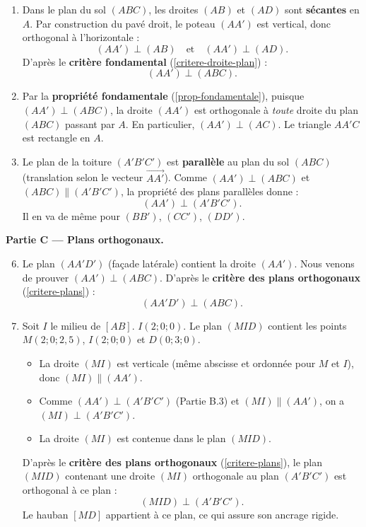 \documentclass[11pt]{article}
\begin{document}
\begin{exoresolu}
\begin{enumerate}[label=\arabic*., ref=\arabic*]
    \item Dans le plan du sol $(ABC)$, les droites $(AB)$ et $(AD)$ sont \textbf{sécantes} en $A$.
    Par construction du pavé droit, le poteau $(AA')$ est vertical, donc orthogonal à l'horizontale :
    \[ (AA') \perp (AB) \quad \text{et} \quad (AA') \perp (AD). \]
    D'après le \textbf{critère fondamental} (\ref{critere-droite-plan}) :
    \[ \boxed{(AA') \perp (ABC)}. \]
    \item Par la \textbf{propriété fondamentale} (\ref{prop-fondamentale}), puisque $(AA') \perp (ABC)$, la droite $(AA')$ est orthogonale à \emph{toute} droite du plan $(ABC)$ passant par $A$.
    En particulier, $(AA') \perp (AC)$. Le triangle $AA'C$ est rectangle en $A$.
    \item Le plan de la toiture $(A'B'C')$ est \textbf{parallèle} au plan du sol $(ABC)$ (translation selon le vecteur $\vec{AA'}$).
    Comme $(AA') \perp (ABC)$ et $(ABC) \parallel (A'B'C')$, la propriété des plans parallèles donne :
    \[ \boxed{(AA') \perp (A'B'C')}. \]
    Il en va de même pour $(BB')$, $(CC')$, $(DD')$.
\end{enumerate}

\textbf{Partie C — Plans orthogonaux.}

\begin{enumerate}[label=\arabic*., ref=\arabic*]
    \setcounter{enumi}{5}
    \item Le plan $(AA'D')$ (façade latérale) contient la droite $(AA')$.
    Nous venons de prouver $(AA') \perp (ABC)$.
    D'après le \textbf{critère des plans orthogonaux} (\ref{critere-plans}) :
    \[ \boxed{(AA'D') \perp (ABC)}. \]
    \item Soit $I$ le milieu de $[AB]$. $I(2;0;0)$. Le plan $(MID)$ contient les points $M(2;0;2,5)$, $I(2;0;0)$ et $D(0;3;0)$.
    \begin{itemize}
        \item La droite $(MI)$ est verticale (même abscisse et ordonnée pour $M$ et $I$), donc $(MI) \parallel (AA')$.
        \item Comme $(AA') \perp (A'B'C')$ (Partie B.3) et $(MI) \parallel (AA')$, on a $(MI) \perp (A'B'C')$.
        \item La droite $(MI)$ est contenue dans le plan $(MID)$.
    \end{itemize}
    D'après le \textbf{critère des plans orthogonaux} (\ref{critere-plans}), le plan $(MID)$ contenant une droite $(MI)$ orthogonale au plan $(A'B'C')$ est orthogonal à ce plan :
    \[ \boxed{(MID) \perp (A'B'C')}. \]
    Le hauban $[MD]$ appartient à ce plan, ce qui assure son ancrage rigide.
\end{enumerate}


\end{exoresolu}
\end{document}
